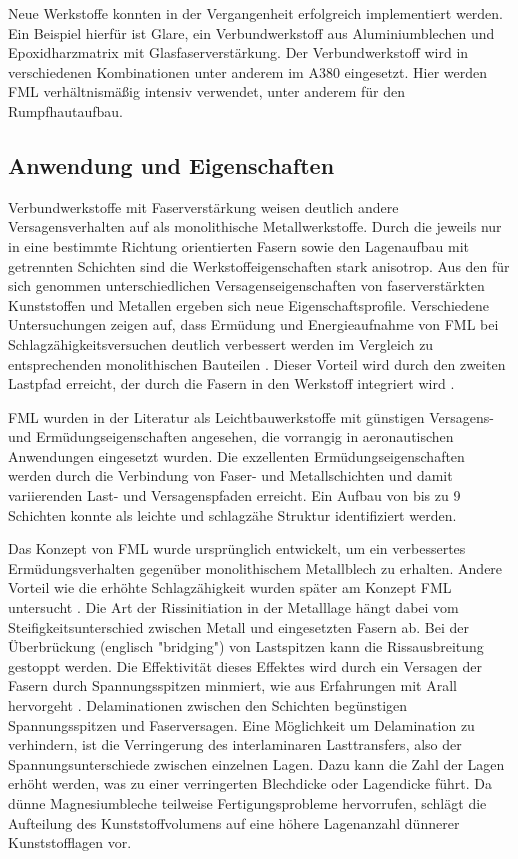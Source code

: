 Neue Werkstoffe konnten in der Vergangenheit erfolgreich implementiert werden. Ein Beispiel hierfür ist Glare, ein Verbundwerkstoff aus Aluminiumblechen und Epoxidharzmatrix mit Glasfaserverstärkung.
Der Verbundwerkstoff wird in verschiedenen Kombinationen unter anderem im A380 eingesetzt. Hier werden FML verhältnismäßig intensiv verwendet, unter anderem für den Rumpfhautaufbau. \cite{Airbus.05.04.2021, Vlot.2001}


 

\subsection{Anwendung und Eigenschaften}\label{sec:Anwendung}

Verbundwerkstoffe mit Faserverstärkung weisen deutlich andere Versagensverhalten auf als monolithische Metallwerkstoffe. Durch die jeweils nur in eine bestimmte Richtung orientierten Fasern sowie den Lagenaufbau mit getrennten Schichten sind die Werkstoffeigenschaften stark anisotrop. Aus den für sich genommen unterschiedlichen Versagenseigenschaften von faserverstärkten Kunststoffen und Metallen ergeben sich neue Eigenschaftsprofile.
Verschiedene Untersuchungen zeigen auf, dass Ermüdung und Energieaufnahme von FML bei Schlagzähigkeitsversuchen deutlich verbessert werden im Vergleich zu entsprechenden monolithischen Bauteilen \cite{Cortes.2005,Botelho.2006}. Dieser Vorteil wird durch den zweiten Lastpfad erreicht, der durch die Fasern in den Werkstoff integriert wird \cite{Beumler.2004}.

FML wurden in der Literatur als Leichtbauwerkstoffe mit günstigen Versagens- und Ermüdungseigenschaften angesehen, die vorrangig in aeronautischen Anwendungen eingesetzt wurden. Die exzellenten Ermüdungseigenschaften werden durch die Verbindung von Faser- und Metallschichten und damit variierenden Last- und Versagenspfaden erreicht. Ein Aufbau von bis zu 9 Schichten konnte als leichte und schlagzähe Struktur identifiziert werden. \cite{Parnanen.2012}

Das Konzept von FML wurde ursprünglich entwickelt, um ein verbessertes Ermüdungsverhalten gegenüber monolithischem Metallblech zu erhalten. Andere Vorteil wie die erhöhte Schlagzähigkeit wurden später am Konzept FML untersucht \cite{Alderliesten.2008}. Die Art der Rissinitiation in der Metalllage hängt dabei vom Steifigkeitsunterschied zwischen Metall und eingesetzten Fasern ab. Bei der Überbrückung (englisch "bridging") von Lastspitzen kann die Rissausbreitung gestoppt werden. Die Effektivität dieses Effektes wird durch ein Versagen der Fasern durch Spannungsspitzen minmiert, wie aus Erfahrungen mit Arall hervorgeht \cite{Marissen.1988}. Delaminationen zwischen den Schichten begünstigen Spannungsspitzen und Faserversagen.
Eine Möglichkeit um Delamination zu verhindern, ist die Verringerung des interlaminaren Lasttransfers, also der Spannungsunterschiede zwischen einzelnen Lagen. Dazu kann die Zahl der Lagen erhöht werden, was zu einer verringerten Blechdicke oder Lagendicke führt. Da dünne Magnesiumbleche teilweise Fertigungsprobleme hervorrufen, schlägt \cite{Alderliesten.2008} die Aufteilung des Kunststoffvolumens auf eine höhere Lagenanzahl dünnerer Kunststofflagen vor. 

